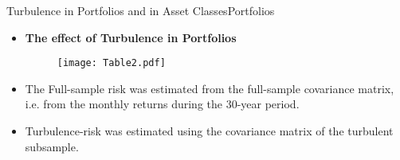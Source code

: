 \documentclass{beamer}
\begin{document}

\begin{frame}{Turbulence in Portfolios and in Asset Classes}{Portfolios}
\begin{itemize}
\vspace*{0in}
\item{\textbf{The effect of Turbulence in Portfolios}}
\vspace*{-0.73in}
\begin{figure}
	\scalebox{0.8}
	{\hspace*{-0.7in}\texttt{[image: Table2.pdf]} }
\end{figure}
\vspace*{-6.43in}
\item{The Full-sample risk was estimated from the full-sample covariance matrix, i.e. from the monthly returns during the 30-year period.}
\item{Turbulence-risk was estimated using the covariance matrix of the turbulent subsample.}
\end{itemize}
\end{frame}
\end{document}
